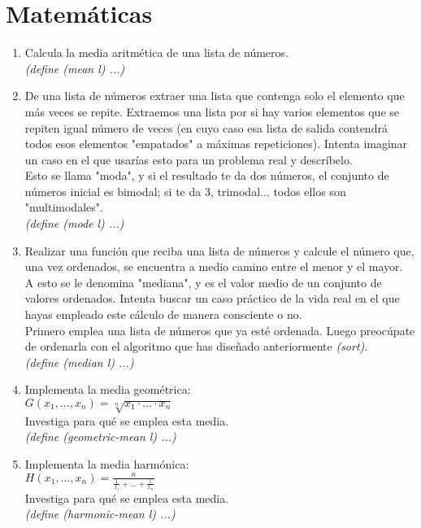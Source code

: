 \documentclass[11pt]{article}
\begin{document}
\section{Matemáticas}
\begin{enumerate}
  \item Calcula la media aritmética de una lista de números.
    \\[3mm]
    \textit{(define (mean l) ...)}

  \item De una lista de números extraer una lista que contenga solo el elemento que más veces se repite. Extraemos una lista por si hay varios elementos que se repiten igual número de veces (en cuyo caso esa lista de salida contendrá todos esos elementos "empatados" a máximas repeticiones).
    Intenta imaginar un caso en el que usarías esto para un problema real y descríbelo.
    \\[3mm]
    Esto se llama "moda", y si el resultado te da dos números, el conjunto de números inicial es bimodal; si te da 3, trimodal... todos ellos son "multimodales".
    \\[3mm]
    \textit{(define (mode l) ...)}

  \item Realizar una función que reciba una lista de números y calcule el número que, una vez ordenados, se encuentra a medio camino entre el menor y el mayor.
    \\[3mm]
    A esto se le denomina "mediana", y es el valor medio de un conjunto de valores ordenados. Intenta buscar un caso práctico de la vida real en el que hayas empleado este cálculo de manera consciente o no.
    \\[3mm]
    Primero emplea una lista de números que ya esté ordenada. Luego preocúpate de ordenarla con el algoritmo que has diseñado anteriormente \textit{(sort)}.
    \\[3mm]
    \textit{(define (median l) ...)}

  \item Implementa la media geométrica:
    \\[3mm]
    {\Large
    $G(x_1,\dots,x_n) = \sqrt[n]{x_1 \cdot \dots \cdot x_n}$
  }
    \\[3mm]
    Investiga para qué se emplea esta media.
    \\[3mm]
    \textit{(define (geometric-mean l) ...)}

  \item Implementa la media harmónica:
    \\[3mm]
    {\Large
    $H(x_1,\dots,x_n) = \frac{n}{\frac{1}{x_1} + \dots + \frac{1}{x_n}}$
  }
    \\[3mm]
    Investiga para qué se emplea esta media.
    \\[3mm]
    \textit{(define (harmonic-mean l) ...)}


\end{enumerate}
\end{document}
